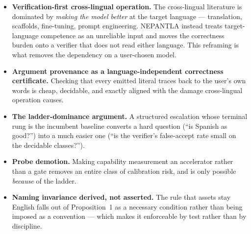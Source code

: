 \begin{itemize}
  \item \textbf{Verification-first cross-lingual operation.} The cross-lingual
        literature is dominated by \emph{making the model better} at the target
        language --- translation, scaffolds, fine-tuning, prompt engineering.
        NEPANTLA instead treats target-language competence as an unreliable
        input and moves the correctness burden onto a verifier that does not
        read either language. This reframing is what removes the dependency on a
        user-chosen model.
  \item \textbf{Argument provenance as a language-independent correctness
        certificate.} Checking that every emitted literal traces back to the
        user's own words is cheap, decidable, and exactly aligned with the
        damage cross-lingual operation causes.
  \item \textbf{The ladder-dominance argument.} A structured escalation whose
        terminal rung is the incumbent baseline converts a hard question
        (``is Spanish as good?'') into a much easier one (``is the verifier's
        false-accept rate small on the decidable classes?'').
  \item \textbf{Probe demotion.} Making capability measurement an accelerator
        rather than a gate removes an entire class of calibration risk, and is
        only possible \emph{because} of the ladder.
  \item \textbf{Naming invariance derived, not asserted.} The rule that assets
        stay English falls out of Proposition~1 as a necessary condition rather
        than being imposed as a convention --- which makes it enforceable by
        test rather than by discipline.
\end{itemize}
